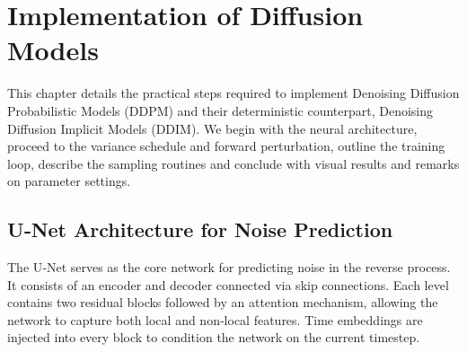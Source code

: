 

\section{Implementation of Diffusion Models}

This chapter details the practical steps required to implement
Denoising Diffusion Probabilistic Models (DDPM) and their deterministic
counterpart, Denoising Diffusion Implicit Models (DDIM).  We begin
with the neural architecture, proceed to the variance schedule and
forward perturbation, outline the training loop, describe the sampling
routines and conclude with visual results and remarks on parameter
settings.

\subsection{U‑Net Architecture for Noise Prediction}

The U‑Net serves as the core network for predicting noise in the
reverse process.  It consists of an encoder and decoder connected via
skip connections.  Each level contains two residual blocks followed by
an attention mechanism, allowing the network to capture both local and
non‑local features.  Time embeddings are injected into every block to
condition the network on the current timestep.

